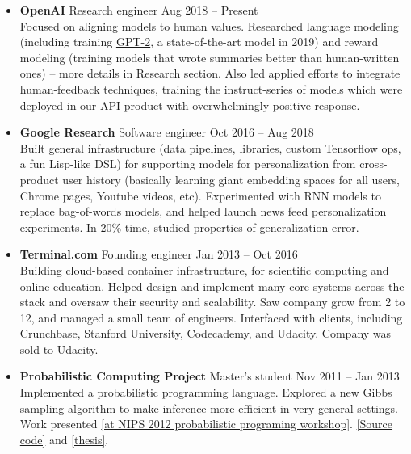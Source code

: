 \documentclass[11 pt]{article}
\begin{document}
\begin{itemize}

\item \textbf{OpenAI} Research engineer \hfill Aug 2018 -- Present \\
Focused on aligning models to human values.  Researched language modeling (including training \href{https://openai.com/blog/better-language-models/}{GPT-2}, a state-of-the-art model in 2019) and reward modeling (training models that wrote summaries better than human-written ones) -- more details in Research section.  Also led applied efforts to integrate human-feedback techniques, training the instruct-series of models which were deployed in our API product with overwhelmingly positive response.


\item \textbf{Google Research} Software engineer \hfill Oct 2016 -- Aug 2018 \\
Built general infrastructure (data pipelines, libraries, custom Tensorflow ops, a fun Lisp-like DSL) for supporting models for personalization from cross-product user history (basically learning giant embedding spaces for all users, Chrome pages, Youtube videos, etc).
Experimented with RNN models to replace bag-of-words models, and helped launch news feed personalization experiments.
In 20\% time, studied properties of generalization error.

\item \textbf{Terminal.com} Founding engineer \hfill Jan 2013 -- Oct 2016 \\
Building cloud-based container infrastructure, for scientific computing and online education.
Helped design and implement many core systems across the stack %
and oversaw their security and scalability.
Saw company grow from 2 to 12, and managed a small team of engineers.
Interfaced with clients, including Crunchbase, Stanford University, Codecademy, and Udacity.
Company was sold to Udacity.

\item \textbf{Probabilistic Computing Project} Master's student \hfill Nov 2011 -- Jan 2013 \\
Implemented a probabilistic programming language.
Explored a new Gibbs sampling algorithm to make inference more efficient in very general settings.
Work presented \href{http://probabilistic-programming.org/wiki/NIPS*2012_Workshop/Schedule#poster-wu}{[at NIPS 2012 probabilistic programing workshop]}.
\href{https://github.com/WuTheFWasThat/PyChurch.}{[Source code]}
and
\href{https://github.com/WuTheFWasThat/PyChurch/blob/master/papers/MEng\%20thesis.pdf}{[thesis]}.



\end{itemize}
\end{document}
